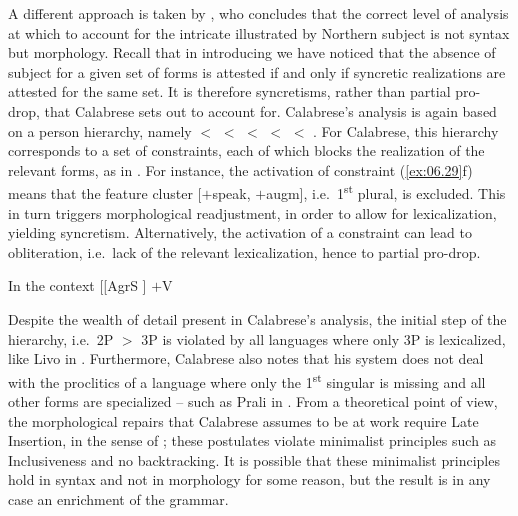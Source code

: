 \documentclass[output=paper]{langsci/langscibook}
\begin{document}
A different approach is taken by \citet{Calabrese2008}, who concludes that the
correct level of analysis at which to account for the intricate 
illustrated by Northern  subject  is not syntax but morphology.
Recall that in introducing  we have noticed that the
absence of subject  for a given set of forms is attested if and only if
syncretic realizations are attested for the same set. It is therefore
syncretisms, rather than partial pro-drop, that Calabrese sets out to account
for. Calabrese’s analysis is again based on a person hierarchy, namely \Ssg{}
$<$ \Tsg{} $<$ \Tpl{} $<$ \Fsg{} $<$ \Spl{} $<$ \Fpl{}. For Calabrese, this hierarchy corresponds to a set
of constraints, each of which blocks the realization of the relevant forms, as
in . For instance, the activation of constraint (\ref{ex:06.29}f)
means that the feature cluster [$+$speak, $+$augm], i.e.\ 1\textsuperscript{st}
plural, is excluded. This in turn triggers morphological readjustment, in order
to allow for lexicalization, yielding syncretism. Alternatively, the activation
of a constraint can lead to obliteration, i.e.\ lack of the relevant
lexicalization, hence to partial pro-drop.

\ea%
    \label{ex:06.29} In the context [[AgrS \underline{\hspace{2em}} ] $+$V
     \tab{\Ssg{}}
             \tab{\Tsg{}}
             \tab{\Tpl{}}
            \tab{\Fsg{}}
     \tab{\Spl{}}
            \tab{\Fpl{}}
    \z
\z

Despite the wealth of detail present in Calabrese’s analysis, the initial step
of the hierarchy, i.e.\ 2P $>$ 3P is violated by all languages where only 3P is
lexicalized, like Livo in . Furthermore, Calabrese also
notes that his system does not deal with the proclitics of a language where
only the 1\textsuperscript{st} singular is missing and all other forms are
specialized – such as Prali in . From a theoretical point
of view, the morphological repairs that Calabrese assumes to be at work require
Late Insertion, in the sense of ; these postulates
violate minimalist principles such as Inclusiveness and no backtracking. It is
possible that these minimalist principles hold in syntax and not in morphology
for some reason, but the result is in any case an enrichment of the grammar.
\end{document}
